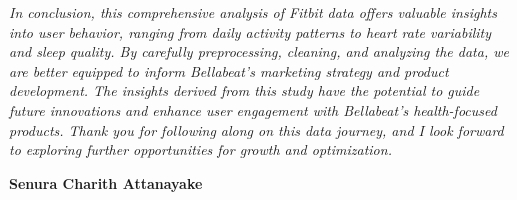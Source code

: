 \documentclass[
]{article}
\begin{document}
\emph{In conclusion, this comprehensive analysis of Fitbit data offers
valuable insights into user behavior, ranging from daily activity
patterns to heart rate variability and sleep quality. By carefully
preprocessing, cleaning, and analyzing the data, we are better equipped
to inform Bellabeat's marketing strategy and product development. The
insights derived from this study have the potential to guide future
innovations and enhance user engagement with Bellabeat's health-focused
products. Thank you for following along on this data journey, and I look
forward to exploring further opportunities for growth and optimization.}

\textbf{Senura Charith Attanayake}
\end{document}
